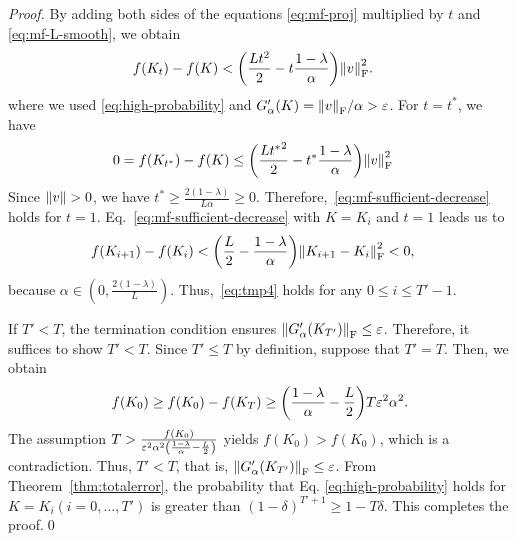 \begin{proof}
  By adding both sides of the equations \eqref{eq:mf-proj} multiplied by $t$ and \eqref{eq:mf-L-smooth}, we obtain
  \begin{align}
    f(K_t)&-f(K)%
 <\qty(\frac{Lt^2}{2}-t\frac{1-\lambda}{\alpha})\normF{v}^2.\label{eq:mf-sufficient-decrease}
  \end{align}
  where we used
\eqref{eq:high-probability} and $G'_\alpha(K)=\norm{v}_\mathrm{F}/\alpha > \varepsilon$.
  For $t = t^*$, we have
  \begin{align}
      0 &= f(K_{t^*})-f(K)\leq \qty(\frac{L{t^*}^2}{2}-{t^*}\frac{1-\lambda}{\alpha})\norm{v}_\mathrm{F}^2
  \end{align}
  Since $\norm{v} > 0$, we have $t^* \geq \frac{2(1-\lambda)}{L\alpha}\geq 0$.
  Therefore,~\eqref{eq:mf-sufficient-decrease} holds for $t = 1$.
  Eq.~\eqref{eq:mf-sufficient-decrease} with $K=K_i$ and $t=1$ leads us to
  \begin{align}
    f(K_{i+1})-f(K_i) & < \qty(\frac{L}{2}-\frac{1-\lambda}{\alpha})\norm{K_{i+1}-K_i}_\mathrm{F}^2 <0,
  \end{align}
  because $\alpha \in (0, \frac{2(1-\lambda)}{L})$.
  Thus,~\eqref{eq:tmp4} holds for any $0\leq i\leq T'-1$.

  If $T' < T$, the termination condition ensures $\norm{G'_\alpha(K_{T'})}_\mathrm{F} \leq \varepsilon$.
  Therefore, it suffices to show $T' < T$.
  Since $T' \leq T$ by definition, suppose that $T' = T$.
  Then, we obtain
  \begin{align}
    f(K_0)  \geq f(K_0)-f(K_{T})%
          \geq \qty(\frac{1-\lambda}{\alpha}-\frac{L}{2})T\varepsilon^2\alpha^2.
  \end{align}
  The assumption $T > \frac{f(K_0)}{\varepsilon^2\alpha^2\qty(\frac{1-\lambda}{\alpha}-\frac{L}{2})}$
  yields $f(K_0)>f(K_0)$, which is a contradiction. Thus, $T'<T$, that is, $\norm{G'_\alpha(K_{T'})}_\mathrm{F}\leq \varepsilon$.
  From Theorem~\ref{thm:totalerror}, the probability that Eq. \eqref{eq:high-probability} holds for $K = K_i(i=0, \dots, T')$ is greater than
  $(1-\delta)^{T'+1}\geq 1-T\delta$.
  This completes the proof.\qed
\end{proof}


